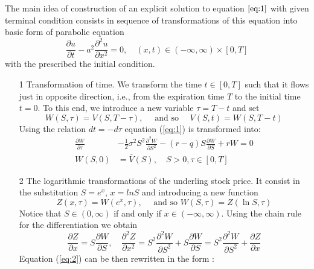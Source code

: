 \documentclass[a4paper]{article}
\begin{document}
The main idea of construction of an explicit solution to equation $\ref{eq:1}$ with given terminal condition consists in sequence of transformations of this 
equation into basic form of parabolic equation
\begin{equation}
    \frac{\partial u}{\partial t}-a^{2} \frac{\partial^{2} u}{\partial x^{2}}=0, \quad(x, t) \in(-\infty, \infty) \times[0, T]
\end{equation}
with the prescribed the initial condition.
\par 
\begin{itemize}
    \item[1] Transformation of time. We transform the time $t \in [0, T]$ such that it flows just in opposite direction, i.e., from the expiration time $T$ to the initial time $t=0$. To this end, we introduce
a new variable $\tau = T -t$ and set
\begin{equation}
    W(S, \tau)=V(S, T-\tau), \quad \text { and so } \quad V(S, t)=W(S, T-t)
\end{equation}
Using the relation $dt = -d\tau $ equation (\ref{eq:1}) is transformed into:
\begin{equation}
    \begin{aligned}
    \frac{\partial W}{\partial \tau} &-\frac{1}{2} \sigma^{2} S^{2} \frac{\partial^{2} W}{\partial S^{2}}-(r-q) S \frac{\partial W}{\partial S}+r W=0 \\
    W(S, 0) &=\bar{V}(S), \quad S>0, \tau \in[0, T]
    \end{aligned}
    \label{eq:2}
\end{equation}
    \item[2] The logarithmic transformations of the underling stock price. It consist in the substitution $S = e^x$, $x = ln S$ and introducing a new function
    \begin{equation}
        Z(x, \tau)=W\left(e^{x}, \tau\right), \quad \text { and so } W(S, \tau)=Z(\ln S, \tau)
    \end{equation}
Notice that $S \in (0, \infty)$ if and only if $x \in (-\infty, \infty)$. Using the chain rule for the differentiation we obtain
\begin{equation}
    \frac{\partial Z}{\partial x}=S \frac{\partial W}{\partial S}, \quad \frac{\partial^{2} Z}{\partial x^{2}}=S^{2} \frac{\partial^{2} W}{\partial S^{2}}+S \frac{\partial W}{\partial S}=S^{2} \frac{\partial^{2} W}{\partial S^{2}}+\frac{\partial Z}{\partial x}
\end{equation}
Equation (\ref{eq:2}) can be then rewritten in the form :

\end{itemize}
\end{document}

